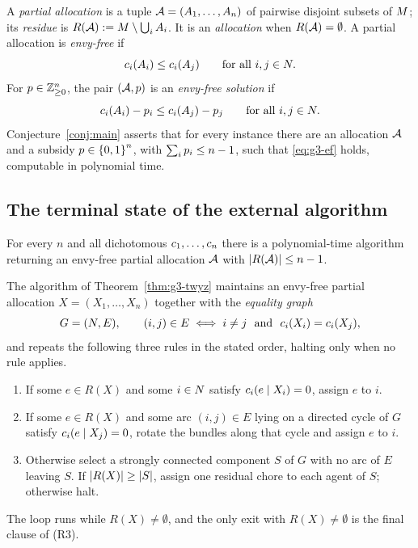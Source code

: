 A \emph{partial allocation} is a tuple $\mathcal{A} = (A_{1},\dots,A_{n})$
of pairwise disjoint subsets of $M$; its \emph{residue} is
$R(\mathcal{A}) := M \setminus \bigcup_{i} A_{i}$. It is an
\emph{allocation} when $R(\mathcal{A}) = \emptyset$. A partial allocation is
\emph{envy-free} if
\begin{equation}
\label{eq:g3-pef}
  c_i(A_{i}) \le c_i(A_{j}) \qquad \text{for all } i,j \in N .
\end{equation}
For $p \in \mathbb{Z}_{\ge0}^n$, the pair $(\mathcal{A},p)$ is an
\emph{envy-free solution} if
\begin{equation}
\label{eq:g3-ef}
  c_i(A_{i}) - p_i \le c_i(A_{j}) - p_j
  \qquad \text{for all } i,j \in N .
\end{equation}
Conjecture~\ref{conj:main} asserts that for every instance there are an
allocation $\mathcal{A}$ and a subsidy $p \in \left\{0,1\right\}^n$, with
$\sum_i p_i \le n-1$, such that \eqref{eq:g3-ef} holds, computable in
polynomial time.

\subsection{The terminal state of the external algorithm}
\label{sec:g3-terminal}

\begin{theorem}
\label{thm:g3-twyz}
For every $n$ and all dichotomous $c_1,\dots,c_n$ there is a
polynomial-time algorithm returning an envy-free partial allocation $\mathcal{A}$
with $\left\lvert R(\mathcal{A})\right\rvert \le n-1$.
\end{theorem}

The algorithm of Theorem~\ref{thm:g3-twyz} maintains an envy-free partial
allocation $X = (X_1,\dots,X_n)$ together with the \emph{equality graph}
\begin{equation}
\label{eq:g3-graph}
  G = (N, E),
  \qquad
  (i,j) \in E \iff i \ne j \ \text{ and } \ c_i(X_i) = c_i(X_j),
\end{equation}
and repeats the following three rules in the stated order, halting only when
no rule applies.
\begin{enumerate}
  \item[(R1)] If some $e \in R(X)$ and some $i \in N$ satisfy
        $c_i(e \mid X_i) = 0$, assign $e$ to $i$.
  \item[(R2)] If some $e \in R(X)$ and some arc $(i,j) \in E$ lying on a
        directed cycle of $G$ satisfy $c_i(e \mid X_j) = 0$, rotate the
        bundles along that cycle and assign $e$ to $i$.
  \item[(R3)] Otherwise select a strongly connected component $S$ of $G$ with
        no arc of $E$ leaving $S$. If $\left\lvert R(X)\right\rvert \ge \left\lvert S\right\rvert$, assign one
        residual chore to each agent of $S$; otherwise halt.
\end{enumerate}
The loop runs while $R(X) \ne \emptyset$, and the only exit with
$R(X) \ne \emptyset$ is the final clause of (R3).


